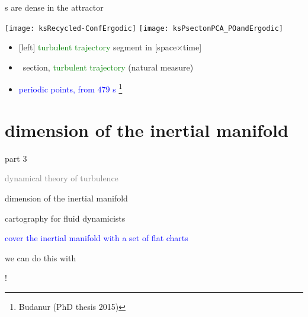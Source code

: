 \begin{frame}{\po s are dense in the attractor}
\begin{center}
\texttt{[image: ksRecycled-ConfErgodic]}
\texttt{[image: ksPsectonPCA\_POandErgodic]}
\end{center}
\begin{itemize}
  \item {[left]} \textcolor{green}{turbulent trajectory} segment in [space$\times$time]
  \item \Poincare\ section, \textcolor{green}{turbulent trajectory} (natural measure)
  \item \textcolor{blue}{periodic points, from $479$ \po s}%
\footnote{\footnotesize
Budanur (PhD thesis 2015)}
\end{itemize}

\end{frame}

\section[dimension of the inertial manifold]
{dimension of the inertial manifold}

\begin{frame}{part 3}
\begin{enumerate}
              \item
    \textcolor{gray}{\small
dynamical theory of turbulence
              \item
\statesp
    }
              \item
    {\Large
dimension of the inertial manifold
                    }
            \end{enumerate}
\end{frame}


\begin{frame}{cartography for fluid dynamicists}
\bigskip

\textcolor{blue}{cover the inertial manifold with a set of flat charts}

\hfill
\vfill
we can do this with

\hfill \color{red}{finite\dmn\ bricks embedded in $10^2$ dimensions}!
\end{frame}

